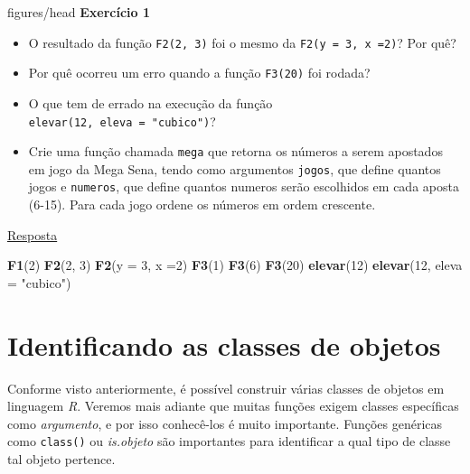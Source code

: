 \documentclass[
]{book}
\makeatletter
\newenvironment{Shaded}{\begin{snugshade}}{\end{snugshade}}
\newcommand{\DataTypeTok}[1]{\textcolor[rgb]{0.13,0.29,0.53}{#1}}
\newcommand{\DecValTok}[1]{\textcolor[rgb]{0.00,0.00,0.81}{#1}}
\newcommand{\KeywordTok}[1]{\textcolor[rgb]{0.13,0.29,0.53}{\textbf{#1}}}
\newcommand{\NormalTok}[1]{#1}
\newcommand{\StringTok}[1]{\textcolor[rgb]{0.31,0.60,0.02}{#1}}
\providecommand{\tightlist}{%
  \setlength{\itemsep}{0pt}\setlength{\parskip}{0pt}}
\numberwithin{equation}{section}
\newcommand{\indf}[1]{\index[function]{#1@\texttt{#1()}|ST}}
\newenvironment{tarefa}
  {\begin{customBlockImage}[colframe=customOrange, title=Tarefa de casa]{figures/head}}
  {\end{customBlockImage}}
\makeatother
\begin{document}
\begin{tarefa}
\textbf{Exercício 1}

\begin{itemize}
\tightlist
\item
  O resultado da função \texttt{F2(2,\ 3)} foi o mesmo da \texttt{F2(y\ =\ 3,\ x\ =2)}? Por quê?
\item
  Por quê ocorreu um erro quando a função \texttt{F3(20)} foi rodada?
\item
  O que tem de errado na execução da função \texttt{elevar(12,\ eleva\ =\ "cubico")}?
\item
  Crie uma função chamada \texttt{mega} que retorna os números a serem apostados em jogo da Mega Sena, tendo como argumentos \texttt{jogos}, que define quantos jogos e \texttt{numeros}, que define quantos numeros serão escolhidos em cada aposta (6-15). Para cada jogo ordene os números em ordem crescente.
\end{itemize}
\end{tarefa}

\protect\hyperlink{exerc1}{Resposta}

\begin{Shaded}
\begin{Highlighting}[]
\KeywordTok{F1}\NormalTok{(}\DecValTok{2}\NormalTok{)}
\KeywordTok{F2}\NormalTok{(}\DecValTok{2}\NormalTok{, }\DecValTok{3}\NormalTok{)}
\KeywordTok{F2}\NormalTok{(}\DataTypeTok{y =} \DecValTok{3}\NormalTok{, }\DataTypeTok{x =}\DecValTok{2}\NormalTok{)}
\KeywordTok{F3}\NormalTok{(}\DecValTok{1}\NormalTok{)}
\KeywordTok{F3}\NormalTok{(}\DecValTok{6}\NormalTok{)}
\KeywordTok{F3}\NormalTok{(}\DecValTok{20}\NormalTok{)}
\KeywordTok{elevar}\NormalTok{(}\DecValTok{12}\NormalTok{)}
\KeywordTok{elevar}\NormalTok{(}\DecValTok{12}\NormalTok{, }\DataTypeTok{eleva =} \StringTok{"cubico"}\NormalTok{)}
\end{Highlighting}
\end{Shaded}

\hypertarget{identificando-as-classes-de-objetos}{%
\section{Identificando as classes de objetos}\label{identificando-as-classes-de-objetos}}

Conforme visto anteriormente, é possível construir várias classes de objetos em linguagem \emph{R}. Veremos mais adiante que muitas funções exigem classes específicas como \emph{argumento}, e por isso conhecê-los é muito importante. Funções genéricas como \texttt{class()} \indf{class} ou \emph{is.objeto} são importantes para identificar a qual tipo de classe tal objeto pertence.
\end{document}
